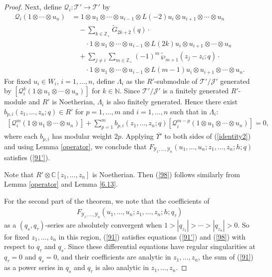 \documentclass[9pt]{amsart}
\newcommand{\T}{\mathcal{T}}
\newcommand{\J}{\mathcal{J}}
\begin{document}
\begin{proof}
Next, define $\mathcal{Q}_i : \T' \rightarrow \T'$ by
\begin{align*}
\mathcal{Q}_i(1 \otimes \cdots \otimes u_n)
&= 1 \otimes u_1 \otimes \cdots \otimes u_{i-1} \otimes 
L(-2) u_i \otimes u_{i+1} \otimes \cdots \otimes u_n \\
&\quad - \sum_{k \in \mathbb{Z}_+} \tilde{G}_{2k+2}(q) \cdot \\
&\qquad \cdot 1 \otimes u_1 \otimes \cdots \otimes u_{i-1} \otimes 
L(2k) u_i \otimes u_{i+1} \otimes \cdots \otimes u_n \\
&\quad + \sum_{j \neq i} \sum_{m \in \mathbb{Z}_+} (-1)^m\, \tilde{\wp}_{m+1}(z_j - z_i; q) \cdot \\
&\qquad \cdot 1 \otimes u_1 \otimes \cdots \otimes u_{i-1} \otimes 
L(m{-}1) u_i \otimes u_{i+1} \otimes \cdots \otimes u_n.
\end{align*}
For fixed $u_i \in W_i$, $i = 1, \dots, n$, define $\Lambda_i$ as the $R'$-submodule of $\T'/\J'$ generated by $[\mathcal{Q}_i^k(1 \otimes u_1 \otimes \cdots \otimes u_n)]$ for $k \in \mathbb{N}$. Since $\T'/\J'$ is a finitely generated $R'$-module and $R'$ is Noetherian, $\Lambda_i$ is also finitely generated. Hence there exist $b_{p,i}(z_1, \dots, z_n; q) \in R'$ for $p = 1, \dots, m$ and $i = 1, \dots, n$ such that in $\Lambda_i$:
\begin{align}\label{identity2}
    [\mathcal{Q}_{i}^{m}(1 \otimes u_1 \otimes \cdots \otimes u_n)]
    + \sum_{p=1}^{m} b_{p,i}(z_1, \dots, z_n; q)
    [\mathcal{Q}_{i}^{m-p}(1 \otimes u_1 \otimes \cdots \otimes u_n)] = 0,
\end{align}
where each $b_{p,i}$ has modular weight $2p$. Applying $\overline{\Upsilon'}$ to both sides of (\ref{identity2}) and using Lemma \ref{operator}, we conclude that $F_{\mathcal{Y}_1, \dots, \mathcal{Y}_n}(u_1, \dots, u_n; z_1, \dots, z_n; h; q)$ satisfies (\ref{91'}).

Note that $R' \otimes \mathbb{C}[z_1, \dots, z_n]$ is Noetherian. Then (\ref{98}) follows similarly from Lemma \ref{operator} and Lemma \ref{6.13}.

For the second part of the theorem, we note that the coefficients of
\begin{align}\label{91}
F_{\mathcal{Y}_{1}, \dots, \mathcal{Y}_{n}}(u_1, \dots, u_n; z_1, \dots, z_n; h; q_\tau)
\end{align}
as a $(q_s, q_\tau)$-series are absolutely convergent when $1 > |q_{z_1}| > \cdots > |q_{z_n}| > 0$. So for fixed $z_1, \dots, z_n$ in this region, (\ref{91}) satisfies equations (\ref{91'}) and (\ref{98}) with respect to $q_\tau$ and $q_s$. Since these differential equations have regular singularities at $q_\tau = 0$ and $q_s = 0$, and their coefficients are analytic in $z_1, \dots, z_n$, the sum of (\ref{91}) as a power series in $q_s$ and $q_\tau$ is also analytic in $z_1, \dots, z_n$.


\end{proof}
\end{document}
